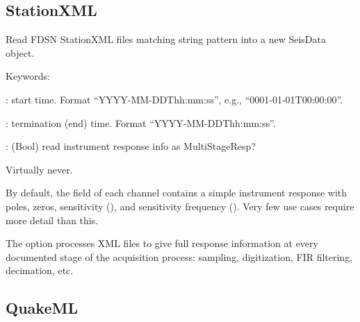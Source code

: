 \documentclass[letterpaper,11pt,english]{sphinxmanual}
\begin{document}
\subsection{StationXML}
\label{\detokenize{src/Formats/xml:stationxml}}

\begin{fulllineitems}
\label{\detokenize{src/Formats/xml:read_sxml}}
\end{fulllineitems}


Read FDSN StationXML files matching string pattern  into a new SeisData
object.

\begin{DUlineblock}{0em}
\item[] Keywords:
\item[] : start time. Format “YYYY-MM-DDThh:mm:ss”, e.g., “0001-01-01T00:00:00”.
\item[] : termination (end) time. Format “YYYY-MM-DDThh:mm:ss”.
\item[] : (Bool) read instrument response info as MultiStageResp?
\end{DUlineblock}

\begin{DUlineblock}{0em}
\item[] 
\item[] Virtually never.
\end{DUlineblock}

By default, the  field of each channel contains a simple instrument
response with poles, zeros, sensitivity (), and sensitivity frequency
(). Very few use cases require more detail than this.

The option  processes XML files to give full response information
at every documented stage of the acquisition process: sampling, digitization,
FIR filtering, decimation, etc.


\subsection{QuakeML}
\label{\detokenize{src/Formats/xml:quakeml}}
\end{document}
